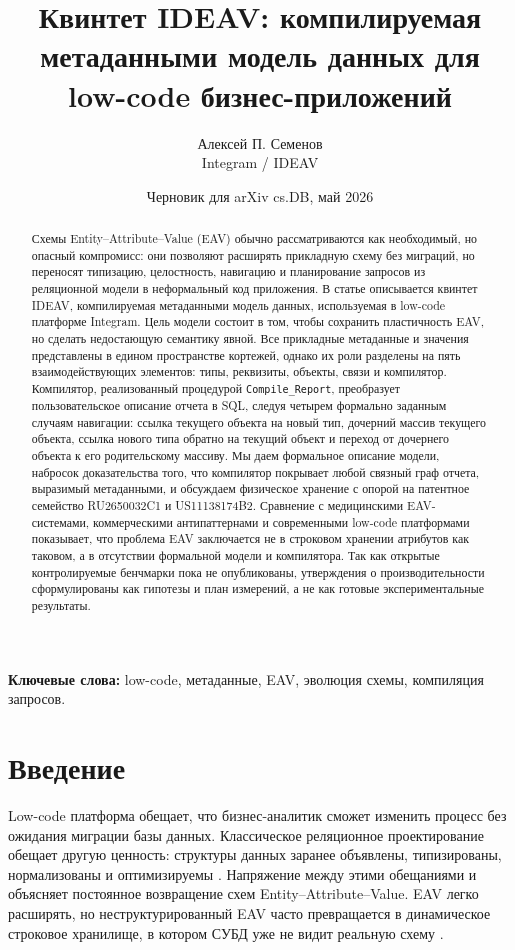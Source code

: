 \documentclass[11pt]{article}
\title{Квинтет IDEAV: компилируемая метаданными модель данных для low-code бизнес-приложений}
\author{Алексей П. Семенов\\Integram / IDEAV}
\date{Черновик для arXiv cs.DB, май 2026}
\begin{document}
\maketitle

\begin{abstract}
Схемы Entity--Attribute--Value (EAV) обычно рассматриваются как необходимый, но
опасный компромисс: они позволяют расширять прикладную схему без миграций, но
переносят типизацию, целостность, навигацию и планирование запросов из
реляционной модели в неформальный код приложения. В статье описывается
квинтет IDEAV, компилируемая метаданными модель данных, используемая в
low-code платформе Integram. Цель модели состоит в том, чтобы сохранить
пластичность EAV, но сделать недостающую семантику явной. Все прикладные
метаданные и значения представлены в едином пространстве кортежей, однако их
роли разделены на пять взаимодействующих элементов: типы, реквизиты, объекты,
связи и компилятор. Компилятор, реализованный процедурой
\texttt{Compile\_Report}, преобразует пользовательское описание отчета в SQL,
следуя четырем формально заданным случаям навигации: ссылка текущего объекта на
новый тип, дочерний массив текущего объекта, ссылка нового типа обратно на
текущий объект и переход от дочернего объекта к его родительскому массиву. Мы
даем формальное описание модели, набросок доказательства того, что компилятор
покрывает любой связный граф отчета, выразимый метаданными, и обсуждаем
физическое хранение с опорой на патентное семейство RU2650032C1 и
US11138174B2. Сравнение с медицинскими EAV-системами, коммерческими
антипаттернами и современными low-code платформами показывает, что проблема EAV
заключается не в строковом хранении атрибутов как таковом, а в отсутствии
формальной модели и компилятора. Так как открытые контролируемые бенчмарки пока
не опубликованы, утверждения о производительности сформулированы как гипотезы
и план измерений, а не как готовые экспериментальные результаты.
\end{abstract}

\noindent\textbf{Ключевые слова:} low-code, метаданные, EAV, эволюция схемы, компиляция запросов.

\section{Введение}

Low-code платформа обещает, что бизнес-аналитик сможет изменить процесс без
ожидания миграции базы данных. Классическое реляционное проектирование обещает
другую ценность: структуры данных заранее объявлены, типизированы, нормализованы
и оптимизируемы \citep{codd1970relational}. Напряжение между этими обещаниями
и объясняет постоянное возвращение схем Entity--Attribute--Value. EAV легко
расширять, но неструктурированный EAV часто превращается в динамическое
строковое хранилище, в котором СУБД уже не видит реальную схему
\citep{karwin2010sql,kyte2003effective}.
\end{document}
